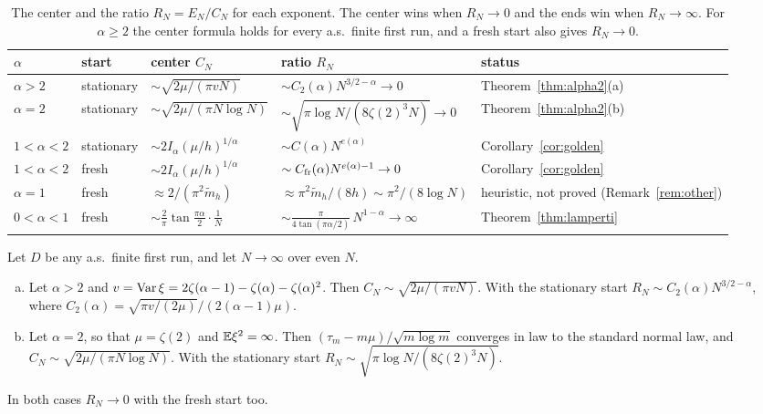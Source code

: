 \begin{table}[t]
\centering\footnotesize
\setlength{\tabcolsep}{4pt}
\begin{tabular}{@{}lllll@{}}
\toprule
$\alpha$ & start & center $C_N$ & ratio $R_N$ & status\\
\midrule
$\alpha>2$ & stationary & $\sim\sqrt{2\mu/(\pi vN)}$ & $\sim C_2(\alpha)N^{3/2-\alpha}\to0$ & Theorem~\ref{thm:alpha2}(a)\\
$\alpha=2$ & stationary & $\sim\sqrt{2\mu/(\pi N\log N)}$ & $\sim\sqrt{\pi\log N/(8\zeta(2)^3N)}\to0$ & Theorem~\ref{thm:alpha2}(b)\\
$1<\alpha<2$ & stationary & $\sim2I_\alpha(\mu/h)^{1/\alpha}$ & $\sim C(\alpha)N^{e(\alpha)}$ & Corollary~\ref{cor:golden}\\
$1<\alpha<2$ & fresh & $\sim2I_\alpha(\mu/h)^{1/\alpha}$ & $\sim C_{\rm fr}(\alpha)N^{e(\alpha)-1}\to0$ & Corollary~\ref{cor:golden}\\
$\alpha=1$ & fresh & $\approx2/(\pi^2\tilde m_h)$ & $\approx\pi^2\tilde m_h/(8h)\sim\pi^2/(8\log N)$ & heuristic, not proved (Remark~\ref{rem:other})\\
$0<\alpha<1$ & fresh & $\sim\frac2\pi\tan\frac{\pi\alpha}2\cdot\frac1N$ & $\sim\frac{\pi}{4\tan(\pi\alpha/2)}\,N^{1-\alpha}\to\infty$ & Theorem~\ref{thm:lamperti}\\
\bottomrule
\end{tabular}
\caption{The center and the ratio $R_N=E_N/C_N$ for each exponent. The center
wins when $R_N\to0$ and the ends win when $R_N\to\infty$. For $\alpha\ge2$ the
center formula holds for every a.s.\ finite first run, and a fresh start also
gives $R_N\to0$.}
\label{tab:outcomes}
\end{table}

\begin{theorem}[$\alpha\ge2$]\label{thm:alpha2}
Let $D$ be any a.s.\ finite first run, and let $N\to\infty$ over even $N$.
\begin{enumerate}[(a)]
\item Let $\alpha>2$ and
$v=\operatorname{Var}\xi=2\zeta(\alpha-1)-\zeta(\alpha)-\zeta(\alpha)^2$. Then
$C_N\sim\sqrt{2\mu/(\pi vN)}$. With the stationary start
$R_N\sim C_2(\alpha)N^{3/2-\alpha}$, where
$C_2(\alpha)=\sqrt{\pi v/(2\mu)}\big/(2(\alpha-1)\mu)$.
\item Let $\alpha=2$, so that $\mu=\zeta(2)$ and $\mathbb{E}\xi^2=\infty$. Then
$(\tau_m-m\mu)/\sqrt{m\log m}$ converges in law to the standard normal law,
and $C_N\sim\sqrt{2\mu/(\pi N\log N)}$. With the stationary start
$R_N\sim\sqrt{\pi\log N/(8\zeta(2)^3N)}$.
\end{enumerate}
In both cases $R_N\to0$ with the fresh start too.
\end{theorem}

